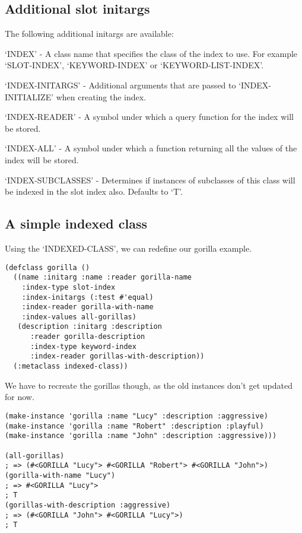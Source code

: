 \subsection{ Additional slot initargs}

The following additional initargs are available:

`INDEX' - A class name that specifies the class of the index to
use. For example `SLOT-INDEX', `KEYWORD-INDEX' or
`KEYWORD-LIST-INDEX'.

`INDEX-INITARGS' - Additional arguments that are passed to
`INDEX-INITIALIZE' when creating the index.

`INDEX-READER' - A symbol under which a query function for the
index will be stored.

`INDEX-ALL' - A symbol under which a function returning all the
values of the index will be stored.

`INDEX-SUBCLASSES' - Determines if instances of subclasses of this
class will be indexed in the slot index also. Defaults to `T'.



\subsection{ A simple indexed class}

Using the `INDEXED-CLASS', we can redefine our gorilla example.

\begin{Verbatim}[fontsize=\small,frame=leftline,framerule=0.9mm,rulecolor=\color{gray},framesep=5.1mm,xleftmargin=5mm,fontfamily=cmtt]
(defclass gorilla ()
  ((name :initarg :name :reader gorilla-name
    :index-type slot-index
    :index-initargs (:test #'equal)
    :index-reader gorilla-with-name
    :index-values all-gorillas)
   (description :initarg :description
      :reader gorilla-description
      :index-type keyword-index
      :index-reader gorillas-with-description))
  (:metaclass indexed-class))
\end{Verbatim}
We have to recreate the gorillas though, as the old instances
don't get updated for now.

\begin{Verbatim}[fontsize=\small,frame=leftline,framerule=0.9mm,rulecolor=\color{gray},framesep=5.1mm,xleftmargin=5mm,fontfamily=cmtt]
(make-instance 'gorilla :name "Lucy" :description :aggressive)
(make-instance 'gorilla :name "Robert" :description :playful)
(make-instance 'gorilla :name "John" :description :aggressive)))

(all-gorillas)
; => (#<GORILLA "Lucy"> #<GORILLA "Robert"> #<GORILLA "John">)
(gorilla-with-name "Lucy")
; => #<GORILLA "Lucy">
; T
(gorillas-with-description :aggressive)
; => (#<GORILLA "John"> #<GORILLA "Lucy">)
; T
\end{Verbatim}


